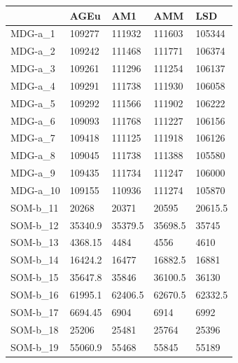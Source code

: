 \documentclass[11pt,a4paper]{article}
\begin{document}
	\begin{table}[H]
		\centering
		\begin{tabular}{l|l|l|l|l|}
			\cline{2-5}
			& AGEu    & AM1     & AMM     & LSD     \\ \hline
			\multicolumn{1}{|l|}{MDG-a\_1}  & 109277  & 111932  & 111603  & 105344  \\ \hline
			\multicolumn{1}{|l|}{MDG-a\_2}  & 109242  & 111468  & 111771  & 106374  \\ \hline
			\multicolumn{1}{|l|}{MDG-a\_3}  & 109261  & 111296  & 111254  & 106137  \\ \hline
			\multicolumn{1}{|l|}{MDG-a\_4}  & 109291  & 111738  & 111930  & 106058  \\ \hline
			\multicolumn{1}{|l|}{MDG-a\_5}  & 109292  & 111566  & 111902  & 106222  \\ \hline
			\multicolumn{1}{|l|}{MDG-a\_6}  & 109093  & 111768  & 111227  & 106156  \\ \hline
			\multicolumn{1}{|l|}{MDG-a\_7}  & 109418  & 111125  & 111918  & 106126  \\ \hline
			\multicolumn{1}{|l|}{MDG-a\_8}  & 109045  & 111738  & 111388  & 105580  \\ \hline
			\multicolumn{1}{|l|}{MDG-a\_9}  & 109435  & 111734  & 111247  & 106000  \\ \hline
			\multicolumn{1}{|l|}{MDG-a\_10} & 109155  & 110936  & 111274  & 105870  \\ \hline
			\multicolumn{1}{|l|}{SOM-b\_11} & 20268   & 20371   & 20595   & 20615.5 \\ \hline
			\multicolumn{1}{|l|}{SOM-b\_12} & 35340.9 & 35379.5 & 35698.5 & 35745   \\ \hline
			\multicolumn{1}{|l|}{SOM-b\_13} & 4368.15 & 4484    & 4556    & 4610    \\ \hline
			\multicolumn{1}{|l|}{SOM-b\_14} & 16424.2 & 16477   & 16882.5 & 16881   \\ \hline
			\multicolumn{1}{|l|}{SOM-b\_15} & 35647.8 & 35846   & 36100.5 & 36130   \\ \hline
			\multicolumn{1}{|l|}{SOM-b\_16} & 61995.1 & 62406.5 & 62670.5 & 62332.5 \\ \hline
			\multicolumn{1}{|l|}{SOM-b\_17} & 6694.45 & 6904    & 6914    & 6992    \\ \hline
			\multicolumn{1}{|l|}{SOM-b\_18} & 25206   & 25481   & 25764   & 25396   \\ \hline
			\multicolumn{1}{|l|}{SOM-b\_19} & 55060.9 & 55468   & 55845   & 55189   \\ \hline

\end{tabular}
\end{table}
\end{document}
